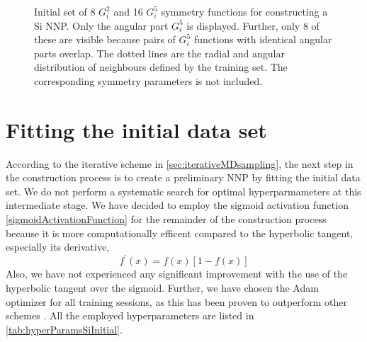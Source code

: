 \documentclass[twoside,english]{uiofysmaster}
\begin{document}
\begin{figure}
\begin{minipage}{0.48\linewidth}
\end{minipage} 
  \caption{Initial set of 8 $G_i^2$ and 16 $G_i^5$ symmetry functions for constructing a Si NNP. Only the angular part 
           $G_i^5$ is displayed. Further, only 8 of these are visible because pairs of $G_i^5$ functions with identical
           angular parts overlap. 
           The dotted lines are the radial and angular distribution of neighbours defined 
           by the training set. The corresponding symmetry parameters is not included. }
  \label{fig:SiInitialSymmSet}
\end{figure}

\section{Fitting the initial data set}
According to the iterative scheme in \autoref{sec:iterativeMDsampling}, the next step in the construction process
is to create a preliminary NNP by fitting the initial data set. We do not perform a systematic search for 
optimal hyperparmameters at this intermediate stage. We have decided to employ the sigmoid activation function 
\eqref{sigmoidActivationFunction} for the remainder of the construction process
because it is more computationally efficent compared to the hyperbolic tangent, especially 
its derivative,
\begin{equation}
 f^\prime(x) = f(x) [1 - f(x)]
\end{equation}
Also, we have not experienced any significant improvement with the use of the hyperbolic tangent over the sigmoid.
Further, we have chosen the Adam optimizer for all training sessions, as this has been proven to outperform other 
schemes \cite{Kingma14}. All the employed hyperparameters are listed in \autoref{tab:hyperParamsSiInitial}. 
\end{document}
